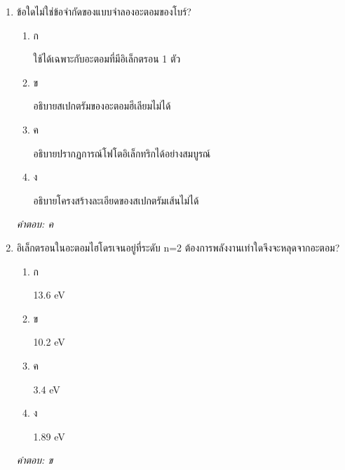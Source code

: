 \documentclass[12pt]{article}
\begin{document}
\begin{enumerate}[label=\arabic*., itemsep=0.5\baselineskip, topsep=0.5\baselineskip, leftmargin=*]
\item ข้อใดไม่ใช่ข้อจำกัดของแบบจำลองอะตอมของโบร์?
\begin{enumerate}[label=\alph*)., itemsep=0.3\baselineskip, topsep=0.3\baselineskip]
\item ก\ 
\begin{minipage}[t]{0.9\linewidth}
\raggedright ใช้ได้เฉพาะกับอะตอมที่มีอิเล็กตรอน 1 ตัว
\end{minipage}
\item ข\ 
\begin{minipage}[t]{0.9\linewidth}
\raggedright อธิบายสเปกตรัมของอะตอมฮีเลียมไม่ได้
\end{minipage}
\item ค\ 
\begin{minipage}[t]{0.9\linewidth}
\raggedright อธิบายปรากฏการณ์โฟโตอิเล็กทริกได้อย่างสมบูรณ์
\end{minipage}
\item ง\ 
\begin{minipage}[t]{0.9\linewidth}
\raggedright อธิบายโครงสร้างละเอียดของสเปกตรัมเส้นไม่ได้
\end{minipage}
\end{enumerate}
\vspace{-0.3\baselineskip}
\begin{small}
\textit{คำตอบ: ค}
\end{small}

\item อิเล็กตรอนในอะตอมไฮโดรเจนอยู่ที่ระดับ n=2 ต้องการพลังงานเท่าใดจึงจะหลุดจากอะตอม?
\begin{enumerate}[label=\alph*)., itemsep=0.3\baselineskip, topsep=0.3\baselineskip]
\item ก\ 
\begin{minipage}[t]{0.9\linewidth}
\raggedright 13.6 eV
\end{minipage}
\item ข\ 
\begin{minipage}[t]{0.9\linewidth}
\raggedright 10.2 eV
\end{minipage}
\item ค\ 
\begin{minipage}[t]{0.9\linewidth}
\raggedright 3.4 eV
\end{minipage}
\item ง\ 
\begin{minipage}[t]{0.9\linewidth}
\raggedright 1.89 eV
\end{minipage}
\end{enumerate}
\vspace{-0.3\baselineskip}
\begin{small}
\textit{คำตอบ: ข}
\end{small}


\end{enumerate}
\end{document}
